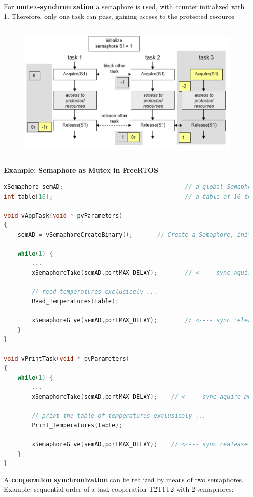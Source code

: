 For \textbf{mutex-synchronization} a semaphore is used, with counter initialized with 1. Therefore, only one task can pass, gaining access to the protected resource: 

 	\begin{figure}[h]
    \centering
    \includegraphics[width=14cm, height=7cm]{Images/image106.png}
    \label{fig:Fig }
    \end{figure}


\textbf{Example: Semaphore as Mutex in FreeRTOS}

\begin{lstlisting}[style=mystyle, language=c]
xSemaphore semAD;									// a global Semaphore
int table[16];										// a table of 16 temperatures

void vAppTask(void * pvParameters)
{
	semAD = vSemaphoreCreateBinary();		// Create a Semaphore, initially 1 

	while(1) {
		...
		xSemaphoreTake(semAD,portMAX_DELAY);		// <---- sync aquire mutex
		
		// read temperatures exclusicely ...
		Read_Temperatures(table);

		xSemaphoreGive(semAD,portMAX_DELAY);		// <---- sync release the mutex
 	}
}

void vPrintTask(void * pvParameters)
{
	while(1) {
		...
		xSemaphoreTake(semAD,portMAX_DELAY);	// <---- sync aquire mutex
		
		// print the table of temperatures exclusicely ...
		Print_Temperatures(table);

		xSemaphoreGive(semAD,portMAX_DELAY);	// <---- sync realease the mutex !
 	}
}
\end{lstlisting}

A \textbf{cooperation synchronization} can be realized by means of two semaphores. Example: sequential order of a task cooperation T2T1T2 with 2 semaphores:

